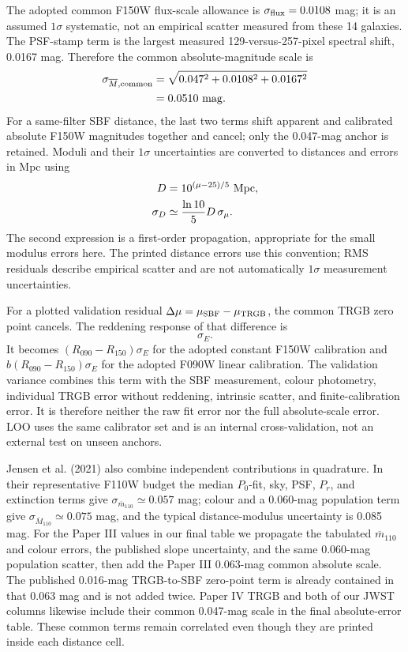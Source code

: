 \documentclass[nodoi,nocopyright]{pas}
\newcommand{\mbar}{\overline{m}}
\newcommand{\Mbar}{\overline{M}}
\begin{document}
The adopted common F150W flux-scale allowance is
$\sigma_{\rm flux}=0.0108$ mag; it is an assumed $1\sigma$ systematic,
not an empirical scatter measured from these 14 galaxies. The PSF-stamp term is the
largest measured 129-versus-257-pixel spectral shift, 0.0167 mag. Therefore
the common absolute-magnitude scale is
\begin{equation}
 \begin{split}
 \sigma_{\Mbar,{\rm common}}
 &=\sqrt{0.047^2+0.0108^2+0.0167^2}\\
 &=0.0510~{\rm mag}.
 \end{split}
\end{equation}
For a same-filter SBF distance, the last two terms shift apparent and
calibrated absolute F150W magnitudes together and cancel; only the 0.047-mag
anchor is retained. Moduli and their $1\sigma$ uncertainties are converted
to distances and errors in Mpc using
\begin{align}
 D&=10^{(\mu-25)/5}~{\rm Mpc},\\
 \sigma_D&\simeq\frac{\ln10}{5}D\,\sigma_\mu.
\end{align}
The second expression is a first-order propagation, appropriate for the
small modulus errors here. The printed distance errors use this convention;
RMS residuals describe empirical scatter and are not automatically $1\sigma$
measurement uncertainties.

For a plotted validation residual
$\Delta\mu=\mu_{\rm SBF}-\mu_{\rm TRGB}$, the common TRGB zero point cancels.
The reddening response of that difference is
\begin{equation}
 [R_{090}-R_X+f'_X(C)(R_{090}-R_{150})]\sigma_E.
\end{equation}
It becomes $(R_{090}-R_{150})\sigma_E$ for the adopted constant F150W
calibration and $b(R_{090}-R_{150})\sigma_E$ for the adopted F090W linear
calibration. The validation variance combines this term with the SBF
measurement, colour photometry, individual TRGB error without reddening,
intrinsic scatter, and finite-calibration error. It is therefore neither the
raw fit error nor the full absolute-scale error. LOO uses the same calibrator
set and is an internal cross-validation, not an external test on unseen
anchors.

Jensen et al. (2021) also combine independent contributions in quadrature. In
their representative F110W budget the median $P_0$-fit, sky, PSF, $P_r$, and
extinction terms give $\sigma_{\mbar_{110}}\simeq0.057$ mag; colour and a
0.060-mag population term give $\sigma_{\Mbar_{110}}\simeq0.075$ mag, and the
typical distance-modulus uncertainty is 0.085 mag. For the Paper III values in
our final table we propagate the tabulated $\mbar_{110}$ and colour errors, the
published slope uncertainty, and the same 0.060-mag population scatter, then
add the Paper III 0.063-mag common absolute scale. The published 0.016-mag
TRGB-to-SBF zero-point term is already contained in that 0.063 mag and is not
added twice. Paper IV TRGB and both of our JWST columns likewise include their
common 0.047-mag scale in the final absolute-error table. These common terms
remain correlated even though they are printed inside each distance cell.
\end{document}
